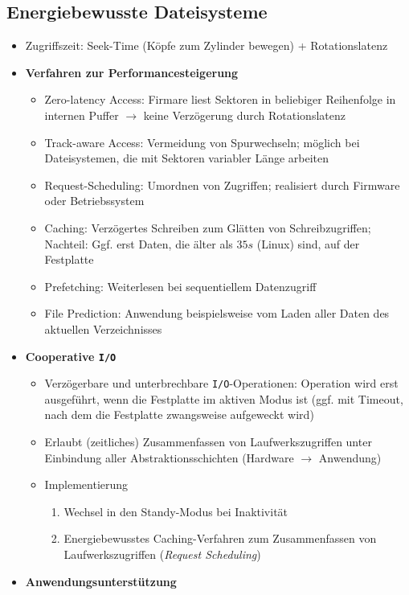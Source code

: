 \subsection{Energiebewusste Dateisysteme}
\begin{itemize}
	\item Zugriffszeit: Seek-Time (Köpfe zum Zylinder bewegen) + Rotationslatenz
	\item \textbf{Verfahren zur Performancesteigerung}
	\begin{itemize}
		\item Zero-latency Access: Firmare liest Sektoren in beliebiger Reihenfolge in internen Puffer \(\rightarrow\) keine Verzögerung durch Rotationslatenz
		\item Track-aware Access: Vermeidung von Spurwechseln; möglich bei Dateisystemen, die mit Sektoren variabler Länge arbeiten
		\item Request-Scheduling: Umordnen von Zugriffen; realisiert durch Firmware oder Betriebssystem
		\item Caching: Verzögertes Schreiben zum Glätten von Schreibzugriffen; Nachteil: Ggf. erst Daten, die älter als \(35s\) (Linux) sind, auf der Festplatte
		\item Prefetching: Weiterlesen bei sequentiellem Datenzugriff
		\item File Prediction: Anwendung beispielsweise vom Laden aller Daten des aktuellen Verzeichnisses
	\end{itemize}
	\item \textbf{Cooperative \texttt{I/O}}
	\begin{itemize}
		\item Verzögerbare und unterbrechbare \texttt{I/O}-Operationen: Operation wird erst ausgeführt, wenn die Festplatte im aktiven Modus ist (ggf. mit Timeout, nach dem die Festplatte zwangsweise aufgeweckt wird)
		\item Erlaubt (zeitliches) Zusammenfassen von Laufwerkszugriffen unter Einbindung aller Abstraktionsschichten (Hardware \(\rightarrow\) Anwendung)
		\item Implementierung
		\begin{enumerate}
			\item Wechsel in den Standy-Modus bei Inaktivität
			\item Energiebewusstes Caching-Verfahren zum Zusammenfassen von Laufwerkszugriffen (\textit{Request Scheduling})
		\end{enumerate}
	\end{itemize}
	\item \textbf{Anwendungsunterstützung}

\end{itemize}
